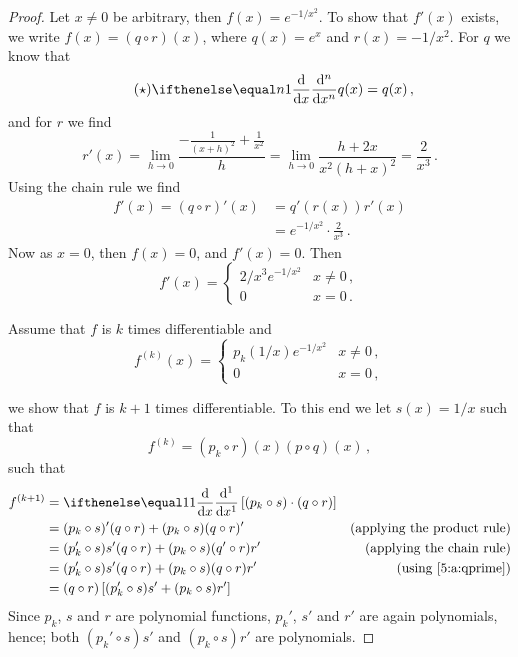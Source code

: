\documentclass[week=6]{homework}
\begin{document}
\begin{questions}
\begin{parts}
\begin{proof}
	    		Let $x \neq 0$ be arbitrary, then $f(x) = e^{-1/x^2}$. To show that $f'(x)$ exists, we write $f(x) = (q\circ r)(x)$, where $q(x) = e^x$ and $r(x) = -1/x^2$.
	    		For $q$ we know that 
	    		\begin{equation} \label{5:a:qprime} \tag{$\star$}
		    		\diff[x][n]{}q(x) = q(x)\,,
	    		\end{equation}
	    		and for $r$ we find
	    		\[
		    		r'(x) = \lim_{h\to 0} \frac{-\frac{1}{(x+h)^2} + \frac{1}{x^2}}{h} = \lim_{h\to 0} \frac{h+2x}{x^2 (h+x)^2} = \frac{2}{x^3}\,.
	    		\]
	    		Using the chain rule we find
	    		\begin{align*}
	    			f'(x) = (q \circ r)'(x) &= q'(r(x))r'(x) \\
		    			&= e^{-1/x^2}\cdot\frac{2}{x^3}\,.
	    		\end{align*}
	    		Now as $x=0$, then $f(x) = 0$, and $f'(x) = 0$. Then
	    		\[
		    		f'(x) = \begin{cases} 2/x^3e^{-1/x^2} & x\neq 0\,, \\ 0 & x = 0\,. \end{cases}
	    		\]
	    		
	    		Assume that $f$ is $k$ times differentiable and
	    		\[
		    		f^{(k)}(x) = \begin{cases} p_k(1/x)e^{-1/x^2} & x\neq 0\,, \\ 0 & x = 0\,, \end{cases}
	    		\]
	    		
	    		we show that $f$ is $k+1$ times differentiable. To this end we let $s(x) = 1/x$ such that
	    		\[
		    		f^{(k)} = (p_k \circ r)(x)(p\circ q)(x)\,,
		    	\]
		    	such that
		    	\begin{align*}
		    		f^{(k+1)} &= \diff{} \left[(p_k \circ s)\cdot(q\circ r)\right] \\
		    		&= (p_k \circ s)'(q\circ r) + (p_k \circ s)(q\circ r)' & \mbox{(applying the product rule)} \\
		    		&= (p_k' \circ s)s' (q\circ r) + (p_k \circ s)(q' \circ r)r' & \mbox{(applying the chain rule)} \\
		    		&= (p_k' \circ s)s' (q\circ r) + (p_k \circ s)(q\circ r)r' & \mbox{(using \ref{5:a:qprime})} \\
		    		&= (q\circ r)\left[ (p_k' \circ s)s'  + (p_k \circ s)r' \right]\\
		    	\end{align*}
		    	Since $p_k$, $s$ and $r$ are polynomial functions, $p_k'$, $s'$ and $r'$ are again polynomials, hence; both $(p_k' \circ s)s'$ and $(p_k \circ s)r'$ are polynomials.
		    	

\end{proof}
\end{parts}
\end{questions}
\end{document}
